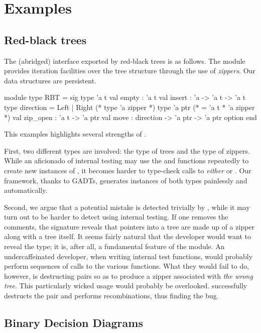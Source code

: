 \section{Examples}

\subsection{Red-black trees}
The (abridged) interface exported by red-black trees is as follows. The module
provides iteration facilities over the tree structure through the use of
\cite{huet-zipper-97}
\emph{zippers}. Our data structures are persistent.
%
\begin{ocamlcode}
module type RBT = sig
  type 'a t
  val empty : 'a t
  val insert : 'a -> 'a t -> 'a t
  type direction = Left | Right
  (* type 'a zipper *)
  type 'a ptr (* = 'a t * 'a zipper *)
  val zip_open : 'a t -> 'a ptr
  val move : direction -> 'a ptr -> 'a ptr option end
\end{ocamlcode}
%
This examples highlights several strengths of \arti.

First, two different types are involved: the type of trees and the type of
zippers. While an aficionado of internal testing may use the  and
 functions repeatedly to create new instances of , it
becomes harder to type-check calls to \emph{either}  or
. Our framework, thanks to GADTs, generates instances of both
types painlessly and automatically.

Second, we argue that a potential mistake is detected trivially by \arti, while
it may turn out to be harder to detect using internal testing. If one removes
the comments, the signature reveals that pointers into a tree are made up of a
zipper along with a tree itself. It seems fairly natural that the developer
would want to reveal the  type; it is, after all, a fundamental
feature of the module. An undercaffeinated developer, when writing internal test
functions, would probably perform sequences of calls to the various functions.
What they would fail to do, however, is destructing pairs so as to produce
a zipper associated with \emph{the wrong tree}. This particularly wicked usage
would probably be overlooked. \arti successfully destructs the pair and performs
recombinations, thus finding the bug.

\subsection{Binary Decision Diagrams}

